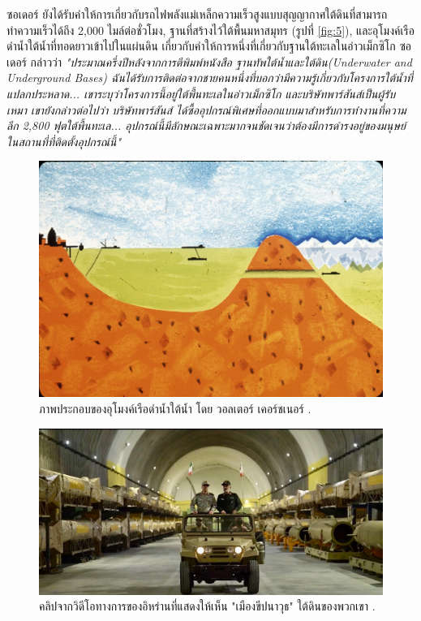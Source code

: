 \documentclass[10pt,twocolumn,letterpaper]{article}
\begin{document}
ซอเดอร์ ยังได้รับคำให้การเกี่ยวกับรถไฟพลังแม่เหล็กความเร็วสูงแบบสุญญากาศใต้ดินที่สามารถทำความเร็วได้ถึง 2,000 ไมล์ต่อชั่วโมง, ฐานที่สร้างไว้ใต้พื้นมหาสมุทร (รูปที่ \ref{fig:5}), และอุโมงค์เรือดำน้ำใต้น้ำที่ทอดยาวเข้าไปในแผ่นดิน เกี่ยวกับคำให้การหนึ่งที่เกี่ยวกับฐานใต้ทะเลในอ่าวเม็กซิโก ซอเดอร์ กล่าวว่า \textit{"ประมาณครึ่งปีหลังจากการตีพิมพ์หนังสือ ฐานทัพใต้น้ำและใต้ดิน(Underwater and Underground Bases) ฉันได้รับการติดต่อจากชายคนหนึ่งที่บอกว่ามีความรู้เกี่ยวกับโครงการใต้น้ำที่แปลกประหลาด... เขาระบุว่าโครงการนี้อยู่ใต้พื้นทะเลในอ่าวเม็กซิโก และบริษัทพาร์สันส์เป็นผู้รับเหมา เขายังกล่าวต่อไปว่า บริษัทพาร์สันส์ ได้ซื้ออุปกรณ์พิเศษที่ออกแบบมาสำหรับการทำงานที่ความลึก 2,800 ฟุตใต้พื้นทะเล... อุปกรณ์นี้มีลักษณะเฉพาะมากจนชัดเจนว่าต้องมีการดำรงอยู่ของมนุษย์ในสถานที่ที่ติดตั้งอุปกรณ์นี้"} \cite{22}
\begin{figure}[t]
\begin{center}
   \includegraphics[width=1\linewidth]{sub.jpg}
\end{center}
   \caption{ภาพประกอบของอุโมงค์เรือดำน้ำใต้น้ำ โดย วอลเตอร์ เคอร์ชเนอร์  \cite{22,23}.}
\label{fig:6}
\label{fig:onecol}
\end{figure}
\begin{figure}[t]
\begin{center}
   \includegraphics[width=1\linewidth]{iran.jpeg}
\end{center}
   \caption{คลิปจากวิดีโอทางการของอิหร่านที่แสดงให้เห็น "เมืองขีปนาวุธ" ใต้ดินของพวกเขา \cite{39,40}.}
\label{fig:12}
\label{fig:onecol}
\end{figure}
\end{document}
